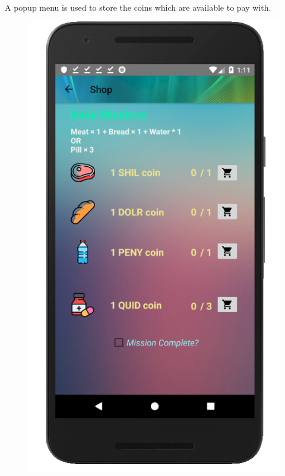 \documentclass[12pt]{article}
\begin{document}
\paragraph{}
A popup menu is used to store the coins which are available to pay with.
\begin{figure}
	\centering
	\includegraphics[scale=0.25]{shop.png}

\end{figure}
\end{document}
